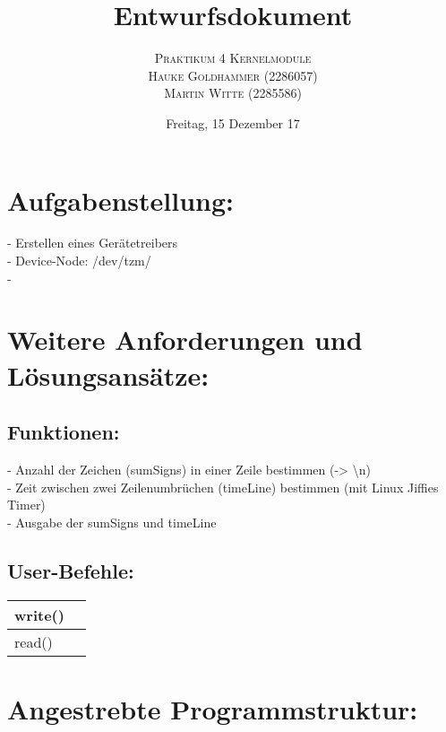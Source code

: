 \documentclass[paper=a4, fontsize=12pt]{article}
\title{\vspace{-15mm}\fontsize{24pt}{10pt}\selectfont\textbf{Entwurfsdokument}} %
\author{
    \large
    {\textsc{Praktikum 4 Kernelmodule}}\\[2mm]
    {\textsc{Hauke Goldhammer (2286057)}}\\[2mm]
    {\textsc{Martin Witte (2285586)}}\\[2mm]
}
\date{Freitag, 15 Dezember 17} %
\begin{document}
\maketitle %
\thispagestyle{fancy} %

\section{Aufgabenstellung:}
- Erstellen eines Gerätetreibers\\
- Device-Node: /dev/tzm/\\
- 



\section{Weitere Anforderungen und Lösungsansätze:}

\subsection{Funktionen:}
- Anzahl der Zeichen (sumSigns) in einer Zeile bestimmen (-> \textbackslash n)\\
- Zeit zwischen zwei Zeilenumbrüchen (timeLine) bestimmen (mit Linux Jiffies Timer)\\
- Ausgabe der sumSigns und timeLine 

\subsection{User-Befehle:}
\begin{tabular}{| l | l |}
\hline
write() & \\
\hline
read() & \\
\hline
\end{tabular}




\section{Angestrebte Programmstruktur:}
\end{document}
